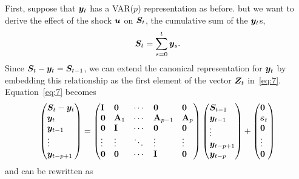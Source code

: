 \documentclass[AER,reviewmode]{tex/AEA}
\begin{document}
First, suppose that $\bm{y}_t$ has a VAR($p$) representation as before.
but we want to derive the effect of the shock $\bm{u}$ on $\bm{S}_t$, the
cumulative sum of the $\bm{y}_t$s,
\[
  \bm{S}_t = \sum_{s=0}^t \bm{y}_s.
\]
Since $\bm{S}_t - \bm{y}_t = \bm{S}_{t-1}$, we can extend the canonical
representation for $\bm{y}_t$ by embedding this relationship as the first
element of the vector $\bm{Z}_t$ in~\eqref{eq:7}. Equation~\eqref{eq:7}
becomes
\begin{equation*}
  \begin{pmatrix*}[l]
    \Sv_t - \yv_t \\ \yv_t \\ \yv_{t-1} \\ \vdots \\ \yv_{t-p+1}
  \end{pmatrix*}
  =
  \begin{pmatrix*}[l]
    \Imat      & \Omat      & \cdots & \Omat       & \Omat      \\
    \Omat      & \Am_1    & \cdots & \Am_{p-1} & \Am_p    \\
    \Omat      & \Imat      & \cdots & \Omat       & \Omat      \\
    \vdots & \vdots & \ddots & \vdots  & \vdots \\
    \Omat      & \Omat      & \cdots & \Imat       & \Omat
  \end{pmatrix*}
  \begin{pmatrix*}[l]
    \Sv_{t-1}  \\ \yv_{t-1} \\ \vdots \\ \yv_{t-p+1} \\ \yv_{t-p}
  \end{pmatrix*}
  +
  \begin{pmatrix*}[l]
    \Ovec \\ \vepv_t \\ \Ovec \\ \vdots \\ \Ovec
  \end{pmatrix*}
\end{equation*}
and can be rewritten as
\end{document}
